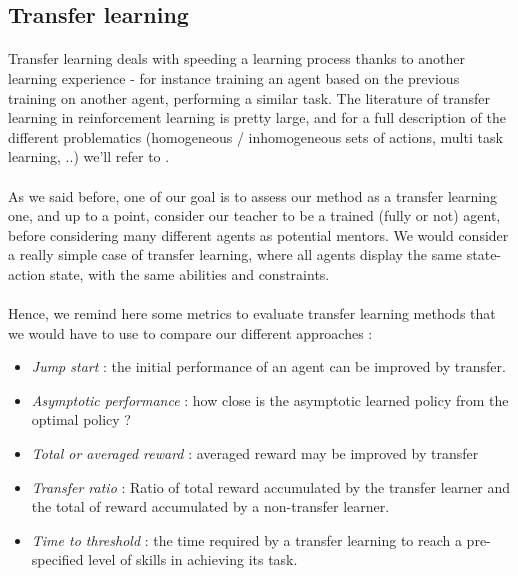 \documentclass[a4paper]{report}
\begin{document}
{{			\subsection{Transfer learning}
			{
				\paragraph{} Transfer learning deals with speeding a learning process thanks to another learning experience - for instance training an agent based on the previous training on another agent, performing a similar task. The literature of transfer learning in reinforcement learning is pretty large, and for a full description of the different problematics (homogeneous / inhomogeneous sets of actions, multi task learning, ..) we'll refer to \cite{taylor2009transfer}. 
				
				\paragraph{} As we said before, one of our goal is to assess our method as a transfer learning one, and up to a point, consider our teacher to be a trained (fully or not) agent, before considering many different agents as potential mentors. We would consider a really simple case of transfer learning, where all agents display the same state-action state, with the same abilities and constraints. 
				
				\paragraph{} Hence, we remind here some metrics to evaluate transfer learning methods that we would have to use to compare our different approaches : 
				\begin{itemize}
					\item \emph{Jump start} : the initial performance of an agent can be improved by transfer. 
					\item \emph{Asymptotic performance} : how close is the asymptotic learned policy from the optimal policy ? 
					\item \emph{Total or averaged reward} : averaged reward may be improved by transfer 
					\item \emph{Transfer ratio} : Ratio of total reward accumulated by the transfer learner and the total of reward accumulated by a non-transfer learner. 
					\item \emph{Time to threshold} : the time required by a transfer learning to reach a pre-specified level of skills in achieving its task. 
				\end{itemize}
				
}}}
\end{document}
